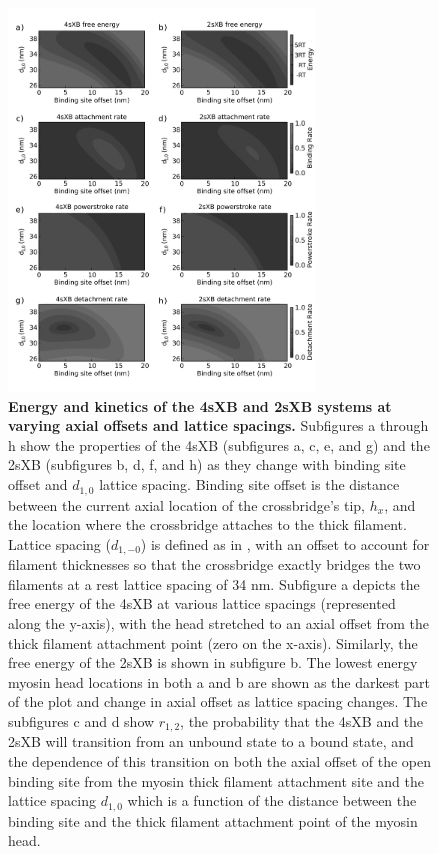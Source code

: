 \documentclass[]{article}
\begin{document}
\begin{figure}[htbp]
    \begin{center}
    \includegraphics[width=3.2in]{../imgs/Figure2.pdf}
    \caption{
        \label{fig_kinetics_contours}
        \textbf{Energy and kinetics of the 4sXB and 2sXB systems at varying axial offsets and lattice spacings.} 
        Subfigures a through h show the properties of the 4sXB (subfigures a, c, e, and g) and the 2sXB (subfigures b, d, f, and h) as they change with binding site offset and $d_{1,0}$ lattice spacing.
        Binding site offset is the distance between the current axial location of the crossbridge's tip, $h_x$, and the location where the crossbridge attaches to the thick filament.
        Lattice spacing ($d_{1,-0}$) is defined as in \citet{Millman1998}, with an offset to account for filament thicknesses so that the crossbridge exactly bridges the two filaments at a rest lattice spacing of 34 nm.
        Subfigure a depicts the free energy of the 4sXB at various lattice spacings (represented along the y-axis), with the head stretched to an axial offset from the thick filament attachment point (zero on the x-axis).
        Similarly, the free energy of the 2sXB is shown in subfigure b.
        The lowest energy myosin head locations in both a and b are shown as the darkest part of the plot and change in axial offset as lattice spacing changes.
        The subfigures c and d show $r_{1,2}$, the probability that the 4sXB and the 2sXB will transition from an unbound state to a bound state, and the dependence of this transition on both the axial offset of the open binding site from the myosin thick filament attachment site and the lattice spacing $d_{1,0}$ which is a function of the distance between the binding site and the thick filament attachment point of the myosin head. 
}
\end{center}
\end{figure}
\end{document}
